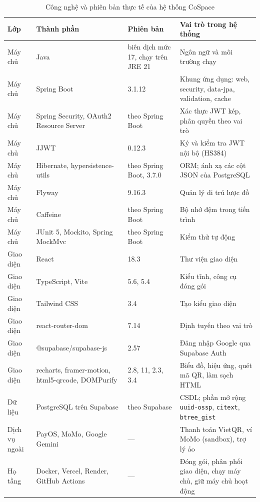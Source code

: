 \begin{table}[H]
\centering
\caption{Công nghệ và phiên bản thực tế của hệ thống CoSpace}
\label{tab:ht_congnghe}
\small
\renewcommand{\arraystretch}{1.25}
\begin{tabular}{|p{2.2cm}|p{4.3cm}|p{2.7cm}|p{4.5cm}|}
\hline
\textbf{Lớp} & \textbf{Thành phần} & \textbf{Phiên bản} & \textbf{Vai trò trong hệ thống} \\
\hline
Máy chủ & Java & biên dịch mức 17, chạy trên JRE 21 & Ngôn ngữ và môi trường chạy \\
\hline
Máy chủ & Spring Boot & 3.1.12 & Khung ứng dụng: web, security, data-jpa, validation, cache \\
\hline
Máy chủ & Spring Security, OAuth2 Resource Server & theo Spring Boot & Xác thực JWT kép, phân quyền theo vai trò \\
\hline
Máy chủ & JJWT & 0.12.3 & Ký và kiểm tra JWT nội bộ (HS384) \\
\hline
Máy chủ & Hibernate, hypersistence-utils & theo Spring Boot, 3.7.0 & ORM; ánh xạ các cột JSON của PostgreSQL \\
\hline
Máy chủ & Flyway & 9.16.3 & Quản lý di trú lược đồ \\
\hline
Máy chủ & Caffeine & theo Spring Boot & Bộ nhớ đệm trong tiến trình \\
\hline
Máy chủ & JUnit 5, Mockito, Spring MockMvc & theo Spring Boot & Kiểm thử tự động \\
\hline
Giao diện & React & 18.3 & Thư viện giao diện \\
\hline
Giao diện & TypeScript, Vite & 5.6, 5.4 & Kiểu tĩnh, công cụ đóng gói \\
\hline
Giao diện & Tailwind CSS & 3.4 & Tạo kiểu giao diện \\
\hline
Giao diện & react-router-dom & 7.14 & Định tuyến theo vai trò \\
\hline
Giao diện & @supabase/supabase-js & 2.57 & Đăng nhập Google qua Supabase Auth \\
\hline
Giao diện & recharts, framer-motion, html5-qrcode, DOMPurify & 2.8, 11, 2.3, 3.4 & Biểu đồ, hiệu ứng, quét mã QR, làm sạch HTML \\
\hline
Dữ liệu & PostgreSQL trên Supabase & theo Supabase & CSDL; phần mở rộng \texttt{uuid-ossp}, \texttt{citext}, \texttt{btree\_gist} \\
\hline
Dịch vụ ngoài & PayOS, MoMo, Google Gemini & --- & Thanh toán VietQR, ví MoMo (sandbox), trợ lý ảo \\
\hline
Hạ tầng & Docker, Vercel, Render, GitHub Actions & --- & Đóng gói, phân phối giao diện, chạy máy chủ, giữ máy chủ hoạt động \\
\hline
\end{tabular}
\end{table}

